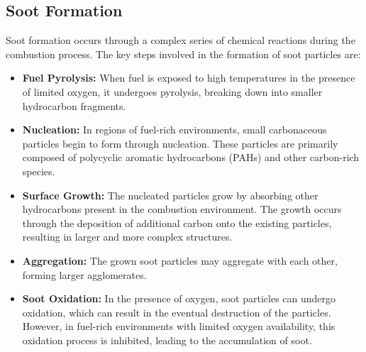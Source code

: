 \subsection{Soot Formation}
Soot formation occurs through a complex series of chemical reactions during the combustion process. The key steps involved in the formation of soot particles are:
\begin{itemize}
    \item \textbf{Fuel Pyrolysis:} When fuel is exposed to high temperatures in the presence of limited oxygen, it undergoes pyrolysis, breaking down into smaller hydrocarbon fragments.
    \item \textbf{Nucleation:} In regions of fuel-rich environments, small carbonaceous particles begin to form through nucleation. These particles are primarily composed of polycyclic aromatic hydrocarbons (PAHs) and other carbon-rich species.
    \item \textbf{Surface Growth:} The nucleated particles grow by absorbing other hydrocarbons present in the combustion environment. The growth occurs through the deposition of additional carbon onto the existing particles, resulting in larger and more complex structures.
    \item \textbf{Aggregation:} The grown soot particles may aggregate with each other, forming larger agglomerates.
    \item \textbf{Soot Oxidation:} In the presence of oxygen, soot particles can undergo oxidation, which can result in the eventual destruction of the particles. However, in fuel-rich environments with limited oxygen availability, this oxidation process is inhibited, leading to the accumulation of soot.
\end{itemize}

